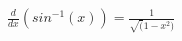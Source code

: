 \documentclass[preview]{standalone}
\begin{document}
\begin{center}
\( \frac{d}{dx}(sin^{-1}(x)) = \frac{1}{\sqrt(1 - x^2)} \)
\end{center}
\end{document}

